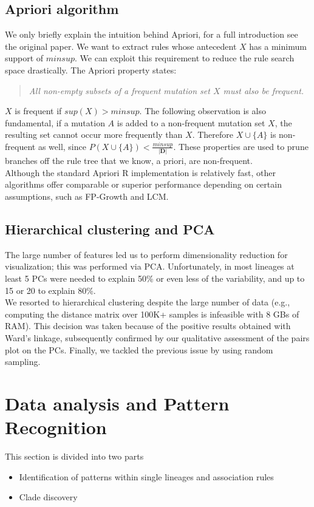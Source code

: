 \documentclass[twoside,twocolumn]{article}
\begin{document}
\subsection{Apriori algorithm}
We only briefly explain the intuition behind Apriori, for a full introduction see the original paper\cite{apriori}. We want to extract rules whose antecedent $X$ has a minimum support of $minsup$. We can exploit this requirement to reduce the rule search space drastically. The Apriori property states:
\begin{quote}
	\textit{All non-empty subsets of a frequent mutation set $X$ must also be frequent.} 
\end{quote}
$X$ is frequent if $sup(X) > minsup$. The following observation is also fundamental, if a mutation $A$ is added to a non-frequent mutation set $X$, the resulting set cannot occur more frequently than $X$. Therefore $X\cup \{A\}$ is non-frequent as well, since $P(X\cup\{A\}) < \frac{minsup}{|\mathbf{D}|}$. These properties are used to prune branches off the rule tree that we know, a priori, are non-frequent. 
\\
Although the standard Apriori R implementation is relatively fast, other algorithms offer comparable or superior performance depending on certain assumptions, such as FP-Growth\cite{fpgrowth} and LCM\cite{lcm}. 
\subsection{Hierarchical clustering and PCA}
 The large number of features led us to perform dimensionality reduction for visualization; this was performed via PCA. Unfortunately, in most lineages at least 5 PCs were needed to explain 50\% or even less of the variability, and up to 15 or 20 to explain 80\%. \\
We resorted to hierarchical clustering despite the large number of data (e.g., computing the distance matrix over 100K+ samples is infeasible with 8 GBs of RAM). This decision was taken because of the positive results obtained with Ward's linkage, subsequently confirmed by our qualitative assessment of the pairs plot on the PCs. Finally, we tackled the previous issue by using random sampling.
\section{Data analysis and Pattern Recognition}
This section is divided into two parts
\begin{itemize}
	\item Identification of patterns within single lineages and association rules
	\item Clade discovery
\end{itemize}
\end{document}

